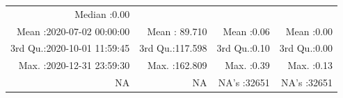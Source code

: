 \documentclass[
  10pt,
  a4paper,oneside]{article}
\begin{document}
\begin{longtable}[]{@{}rrrr@{}}
\begin{minipage}[t]{0.17\columnwidth}
Median :0.00\strut
\end{minipage}\tabularnewline
\begin{minipage}[t]{0.34\columnwidth}\raggedleft
Mean :2020-07-02 00:00:00\strut
\end{minipage} & \begin{minipage}[t]{0.20\columnwidth}\raggedleft
Mean : 89.710\strut
\end{minipage} & \begin{minipage}[t]{0.17\columnwidth}\raggedleft
Mean :0.06\strut
\end{minipage} & \begin{minipage}[t]{0.17\columnwidth}\raggedleft
Mean :0.00\strut
\end{minipage}\tabularnewline
\begin{minipage}[t]{0.34\columnwidth}\raggedleft
3rd Qu.:2020-10-01 11:59:45\strut
\end{minipage} & \begin{minipage}[t]{0.20\columnwidth}\raggedleft
3rd Qu.:117.598\strut
\end{minipage} & \begin{minipage}[t]{0.17\columnwidth}\raggedleft
3rd Qu.:0.10\strut
\end{minipage} & \begin{minipage}[t]{0.17\columnwidth}\raggedleft
3rd Qu.:0.00\strut
\end{minipage}\tabularnewline
\begin{minipage}[t]{0.34\columnwidth}\raggedleft
Max. :2020-12-31 23:59:30\strut
\end{minipage} & \begin{minipage}[t]{0.20\columnwidth}\raggedleft
Max. :162.809\strut
\end{minipage} & \begin{minipage}[t]{0.17\columnwidth}\raggedleft
Max. :0.39\strut
\end{minipage} & \begin{minipage}[t]{0.17\columnwidth}\raggedleft
Max. :0.13\strut
\end{minipage}\tabularnewline
\begin{minipage}[t]{0.34\columnwidth}\raggedleft
NA\strut
\end{minipage} & \begin{minipage}[t]{0.20\columnwidth}\raggedleft
NA\strut
\end{minipage} & \begin{minipage}[t]{0.17\columnwidth}\raggedleft
NA's :32651\strut
\end{minipage} & \begin{minipage}[t]{0.17\columnwidth}\raggedleft
NA's :32651\strut
\end{minipage}\tabularnewline
\bottomrule
\end{longtable}
\end{document}
